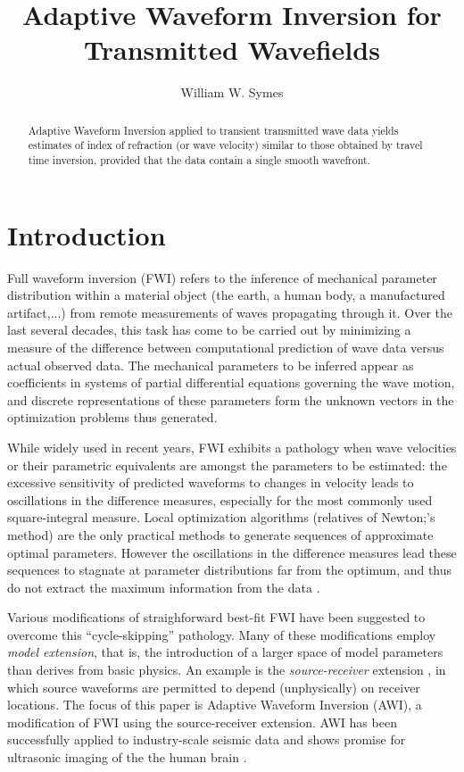 \title{Adaptive Waveform Inversion for Transmitted Wavefields}
\author{William W. Symes}

\begin{abstract}
Adaptive Waveform Inversion
applied to transient transmitted wave data yields estimates of index of
refraction (or wave velocity) similar to those obtained by travel time
inversion, provided that the data contain a single smooth wavefront.
\end{abstract}

\section{Introduction}
Full waveform inversion (FWI) refers to the inference of mechanical
parameter distribution within a material object  (the earth, a human
body, a manufactured artifact,...) from remote measurements of waves
propagating through it. Over the last several decades, this task has come to
be carried out by minimizing a measure of the difference between computational
prediction of wave data versus actual observed
data. The mechanical parameters to be inferred appear as
coefficients in systems of partial differential equations governing
the wave motion, and discrete representations of these parameters form
the unknown vectors in the optimization problems thus generated.

While widely used in recent years, FWI exhibits a pathology when wave
velocities or their parametric equivalents are amongst the parameters
to be estimated: the excessive sensitivity of predicted waveforms to
changes in velocity leads to oscillations in the difference measures,
especially for the most commonly used square-integral measure. Local
optimization algorithms (relatives of Newton;'s method) are the only practical
methods to generate sequences of approximate optimal
parameters. However the oscillations in the difference measures lead
these sequences to stagnate at parameter distributions
far from the optimum, and thus do not extract the maximum information
from the data \cite[]{VirieuxOperto:09}. 

Various modifications of straighforward best-fit FWI have been
suggested to overcome this ``cycle-skipping'' pathology. Many of these
modifications employ {\em model extension}, that is, the introduction
of a larger space of model parameters than derives from basic
physics. An example is the {\em source-receiver} extension \cite[]{HuangSymes:17}, in which
source waveforms are permitted to depend (unphysically) on receiver
locations. The focus of this paper is Adaptive Waveform Inversion
\cite[]{Warner:16} (AWI), a modification of FWI using the
source-receiver extension. AWI has been successfully applied to industry-scale seismic data
\cite[]{GuaschWarnerRavaut:GEO19,Warneretal:SEG21} and shows promise for
ultrasonic imaging of the the human brain
\cite[]{Guaschetal:NPJDM20}.

